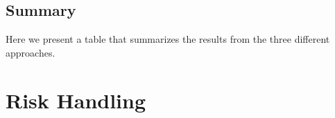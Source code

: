 \subsection{Summary}
Here we present a table that summarizes the results from the three different approaches. 

\section{Risk Handling}


